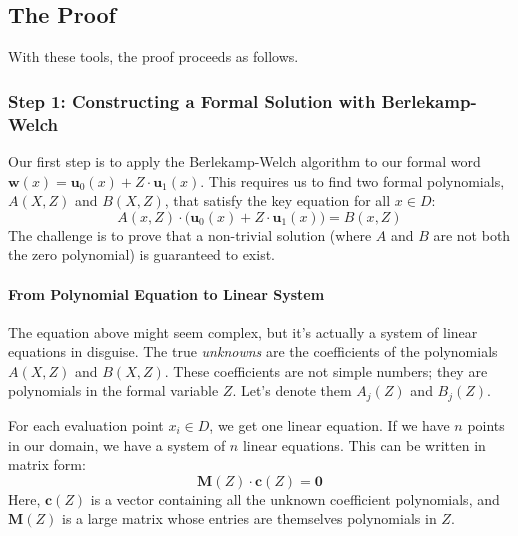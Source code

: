 \documentclass{article}
\begin{document}



\subsection{The Proof}
With these tools, the proof proceeds as follows.




\subsubsection{Step 1: Constructing a Formal Solution with Berlekamp-Welch}
Our first step is to apply the Berlekamp-Welch algorithm to our formal word $\mathbf{w}(x) = \mathbf{u}_0(x) + Z \cdot \mathbf{u}_1(x)$. This requires us to find two formal polynomials, $A(X,Z)$ and $B(X,Z)$, that satisfy the key equation for all $x \in D$:
\[ A(x, Z) \cdot \big(\mathbf{u}_0(x) + Z \cdot \mathbf{u}_1(x)\big) = B(x, Z) \]
The challenge is to prove that a non-trivial solution (where $A$ and $B$ are not both the zero polynomial) is guaranteed to exist.

\paragraph{From Polynomial Equation to Linear System}
The equation above might seem complex, but it's actually a system of linear equations in disguise. The true \textit{unknowns} are the coefficients of the polynomials $A(X,Z)$ and $B(X,Z)$. These coefficients are not simple numbers; they are polynomials in the formal variable $Z$. Let's denote them $A_j(Z)$ and $B_j(Z)$.

For each evaluation point $x_i \in D$, we get one linear equation. If we have $n$ points in our domain, we have a system of $n$ linear equations. This can be written in matrix form:
\[ \mathbf{M}(Z) \cdot \mathbf{c}(Z) = \mathbf{0} \]
Here, $\mathbf{c}(Z)$ is a vector containing all the unknown coefficient polynomials, and $\mathbf{M}(Z)$ is a large matrix whose entries are themselves polynomials in $Z$.
\end{document}
